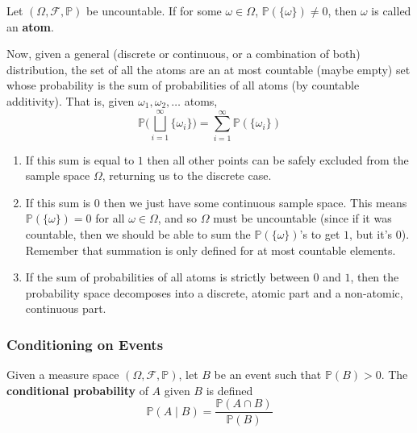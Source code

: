     \begin{definition}[Atom]
      Let $(\Omega, \mathcal{F}, \mathbb{P})$ be uncountable. If for some $\omega \in \Omega$, $\mathbb{P}(\{\omega\}) \neq 0$, then $\omega$ is called an \textbf{atom}. 
    \end{definition}

    Now, given a general (discrete or continuous, or a combination of both) distribution, the set of all the atoms are an at most countable (maybe empty) set whose probability is the sum of probabilities of all atoms (by countable additivity). That is, given $\omega_1, \omega_2, \ldots$ atoms, 
    \begin{equation}
      \mathbb{P} \bigg( \bigsqcup_{i=1}^\infty \{\omega_i\} \bigg) = \sum_{i=1}^\infty \mathbb{P}(\{\omega_i\})
    \end{equation}
    \begin{enumerate}
      \item If this sum is equal to $1$ then all other points can be safely excluded from the sample space $\Omega$, returning us to the discrete case. 
      \item If this sum is $0$ then we just have some continuous sample space. This means $\mathbb{P}(\{\omega\}) = 0$ for all $\omega \in \Omega$, and so $\Omega$ must be uncountable (since if it was countable, then we should be able to sum the $\mathbb{P}(\{\omega\})$'s to get $1$, but it's $0$). Remember that summation is only defined for at most countable elements. 
      \item If the sum of probabilities of all atoms is strictly between $0$ and $1$, then the probability space decomposes into a discrete, atomic part and a non-atomic, continuous part. 
    \end{enumerate}

  \subsubsection{Conditioning on Events}

    \begin{definition}
      Given a measure space $(\Omega, \mathcal{F}, \mathbb{P})$, let $B$ be an event such that $\mathbb{P}(B) > 0$. The \textbf{conditional probability} of $A$ given $B$ is defined 
      \begin{equation}
        \mathbb{P}(A \mid B) = \frac{\mathbb{P}(A \cap B)}{\mathbb{P}(B)}
      \end{equation}
    \end{definition}

